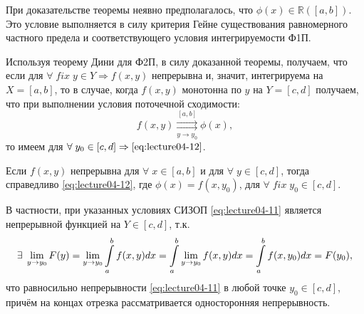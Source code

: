 \begin{notes}
	\item При доказательстве теоремы неявно предполагалось, что $\phi(x) \in \mathbb{R}([a,b])$. Это условие выполняется в силу критерия Гейне существования равномерного частного предела и соответствующего условия интегрируемости Ф1П.
	\item Используя теорему Дини для Ф2П, в силу доказанной теоремы, получаем, что если для $\forall \; fix \; y \in Y \Rightarrow f(x,y)$ непрерывна и, значит, интегрируема на $X = [a,b]$, то в случае, когда $f(x,y)$ монотонна по $y$ на $Y = [c,d]$ получаем, что при выполнении условия поточечной сходимости:
	\begin{equation*}
	f(x,y) \underset{y \to y_0}{\overset{[a,b]}{\rightrightarrows}} \phi(x),
	\end{equation*}
	то имеем для $\forall \; y_0 \in [c,d] \Rightarrow \eqref{eq:lecture04-12}$.
	\item Если $f(x,y)$ непрерывна для $\forall \; x \in [a,b]$ и для $\forall \; y \in [c,d]$, тогда справедливо \eqref{eq:lecture04-12}, где $\phi(x) = f(x, y_0)$, для $\forall \; fix \; y_0 \in [c,d]$.

	В частности, при указанных условиях СИЗОП \eqref{eq:lecture04-11} является непрерывной функцией на $Y \in [c,d]$, т.к.
	\begin{equation*}
	\exists \; \lim\limits_{y \to y_0} F(y) = \lim\limits_{y \to y_0} \displaystyle\int\limits_a^b f(x,y)dx = \displaystyle\int\limits_a^b \lim\limits_{y \to y_0} f(x,y)dx= \displaystyle\int\limits_a^b f(x,y_0)dx = F(y_0),
	\end{equation*}
	что равносильно непрерывности \eqref{eq:lecture04-11} в любой точке $y_0 \in [c,d]$, причём на концах отрезка рассматривается односторонняя непрерывность.
\end{notes}
